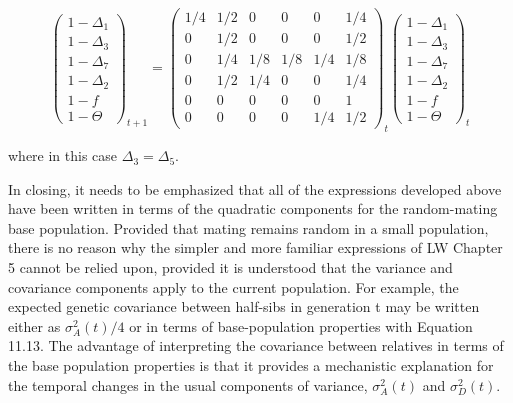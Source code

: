 \documentclass{article}
\begin{document}
\begin{equation}
\begin{pmatrix}1-\Delta_{1}\\1-\Delta_{3}\\1-\Delta_{7}\\1-\Delta_{2}\\1-f\\1-\Theta\end{pmatrix}_{t+1}=\begin{pmatrix}1/4&1/2&0&0&0&1/4\\0&1/2&0&0&0&1/2\\0&1/4&1/8&1/8&1/4&1/8\\0&1/2&1/4&0&0&1/4\\0&0&0&0&0&1\\0&0&0&0&1/4&1/2\end{pmatrix}_{t}\begin{pmatrix}1-\Delta_{1}\\1-\Delta_{3}\\1-\Delta_{7}\\1-\Delta_{2}\\1-f\\1-\Theta\end{pmatrix}_{t}
\tag{11.18}
\label{eq:11_18}
\end{equation}

where in this case  $ \Delta_{3} = \Delta_{5} $.

In closing, it needs to be emphasized that all of the expressions developed above have been written in terms of the quadratic components for the random-mating base population. Provided that mating remains random in a small population, there is no reason why the simpler and more familiar expressions of LW Chapter 5 cannot be relied upon, provided it is understood that the variance and covariance components apply to the current population. For example, the expected genetic covariance between half-sibs in generation t may be written either as  $ \sigma_A^2(t)/4 $ or in terms of base-population properties with Equation 11.13. The advantage of interpreting the covariance between relatives in terms of the base population properties is that it provides a mechanistic explanation for the temporal changes in the usual components of variance,  $ \sigma_A^2(t) $ and  $ \sigma_D^2(t) $.
\end{document}
